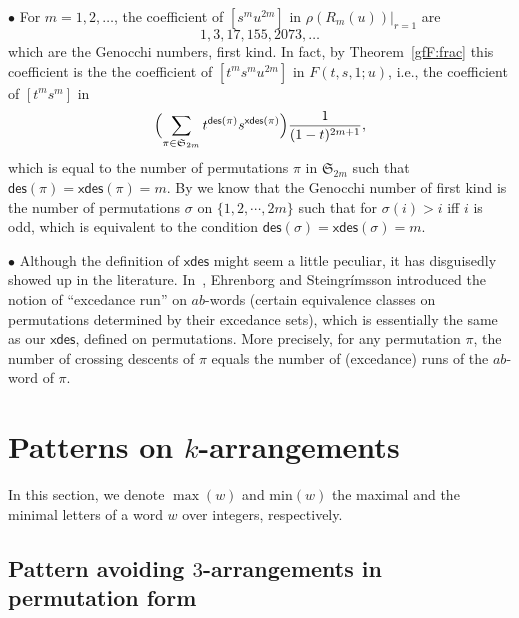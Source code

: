 \documentclass[12pt]{amsart}
\numberwithin{equation}{section}
\theoremstyle{plain}
\theoremstyle{definition}
\def\xdes{\mathsf{xdes}}
\def\max{\mathrm{max}}
\def\min{\mathrm{min}}
\def\des{\mathsf{des}}
\def\S{\mathfrak{S}}
\def\max{\operatorname{max}}
\begin{document}
\medskip

$\bullet$ For $m=1,2,\ldots$, the coefficient of $[s^m u^{2m}]$ in 
$\rho(R_m(u))|_{r=1}$ are
$$
1,3,17,155,2073, \ldots 
$$
which are the Genocchi numbers, first kind. In fact, 
by Theorem~\ref{gfF:frac} this coefficient is the the coefficient of
$[t^m s^m u^{2m}]$ in $F(t,s,1;u)$, i.e., the coefficient of $[t^m s^m]$ in
\begin{equation*}
	\Bigl( \sum_{\pi\in \S_{2m}} 
	 t^{\des(\pi)}  s^{\xdes(\pi)} \Bigr) \frac {1}{(1-t)^{2m+1}},
\end{equation*}
which is equal to the number of permutations $\pi$ in $\S_{2m}$ such that $\des(\pi)=\xdes(\pi)=m$. By \cite{Dumont1974,Dumont1994Rand} we know that the Genocchi number of first kind 
is the number of permutations $\sigma$ on $\{1,2,\cdots, 2m\}$ such that 
for $\sigma(i)>i$ iff $i$ is odd, which is equivalent to the condition $\des(\sigma)=\xdes(\sigma)=m$.
\medskip

$\bullet$ Although the definition of $\xdes$ might seem a little peculiar, it has disguisedly showed up in the literature. In~\cite[Def.~4.1]{es}, Ehrenborg and Steingr\'imsson introduced the notion of ``excedance run'' on $ab$-words (certain equivalence classes on permutations determined by their excedance sets), which is essentially the same as our $\xdes$, defined on permutations. More precisely, for any permutation $\pi$, the number of crossing descents of $\pi$ equals the number of (excedance) runs of the $ab$-word of $\pi$.




\section{Patterns on \texorpdfstring{$k$-arrangements}{k-arrangements}}

\label{sec:5}
In this section, we denote $\max(w)$ and $\min(w)$ the maximal and the minimal letters of a word $w$ over integers, respectively.
\subsection{Pattern avoiding \texorpdfstring{$3$-arrangements}{3-arrangements} in permutation form}
\end{document}
